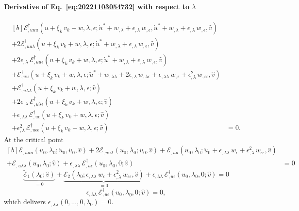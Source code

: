\documentclass[12pt, final]{scrartcl}
\theoremstyle{definition}
\newcommand{\E}{\mathcal E}
\newcommand{\EE}{\mathcal E ^ \dagger}
\begin{document}
\paragraph{Derivative of Eq.~\eqref{eq:20221103054732} with respect to \(\lambda\)}
\begin{equation}
  \label{eq:20221116070255}
  \begin{aligned}[b]
    \EE_{,uuu}(u + \xi_k \, v_k + w, \lambda, \epsilon; \dot{u}^\ast + w_{,\lambda} + \epsilon_{,\lambda} \, w_{,\epsilon}, \dot{u}^\ast + w_{,\lambda} + \epsilon_{,\lambda} \, w_{,\epsilon}, \hat{v}) &\\
    + 2\EE_{,uu\lambda}(u + \xi_k \, v_k + w, \lambda, \epsilon; \dot{u}^\ast + w_{,\lambda} + \epsilon_{,\lambda} \, w_{,\epsilon}, \hat{v}) &\\
    + 2\epsilon_{,\lambda} \, \EE_{,uu\epsilon}(u + \xi_k \, v_k + w, \lambda, \epsilon; \dot{u}^\ast + w_{,\lambda} + \epsilon_{,\lambda} \, w_{,\epsilon}, \hat{v}) &\\
    + \EE_{,uu}(u + \xi_k \, v_k + w, \lambda, \epsilon; \ddot{u}^\ast + w_{,\lambda\lambda} + 2\epsilon_{,\lambda} \, w_{,\lambda\epsilon} + \epsilon_{,\lambda\lambda} \, w_{,\epsilon} + \epsilon_{,\lambda}^2 \, w_{,\epsilon\epsilon}, \hat{v}) &\\
    + \EE_{,u\lambda\lambda}(u + \xi_k \, v_k + w, \lambda, \epsilon; \hat{v})&\\
    + 2\epsilon_{,\lambda} \, \EE_{,u\lambda\epsilon}(u + \xi_k \, v_k + w, \lambda, \epsilon; \hat{v}) &\\
    + \epsilon_{,\lambda\lambda} \, \EE_{,u\epsilon}(u + \xi_k \, v_k + w, \lambda, \epsilon; \hat{v}) &\\
    + \epsilon_{,\lambda}^2 \, \EE_{,u\epsilon\epsilon}(u + \xi_k \, v_k + w, \lambda, \epsilon; \hat{v}) &= 0.
  \end{aligned}
\end{equation}
At the critical point
\begin{equation*}
  \begin{aligned}[b]
    \E_{,uuu}(u_0, \lambda_0; \dot{u}_0, \dot{u}_0, \hat{v}) + 2\E_{,uu\lambda}(u_0, \lambda_0; \dot{u}_0, \hat{v}) + \E_{,uu}(u_0, \lambda_0; \ddot{u}_0 + \epsilon_{,\lambda\lambda} \, w_\epsilon + \epsilon_{,\lambda}^2 \, w_{\epsilon\epsilon}, \hat{v}) &\\
    + \E_{,u\lambda\lambda}(u_0, \lambda_0; \hat{v}) + \epsilon_{,\lambda\lambda} \, \EE_{,u\epsilon}(u_0, \lambda_0, 0; \hat{v}) &= 0
  \end{aligned}
\end{equation*}
\begin{equation*}
  \underbrace{\ddot{\E}_1(\lambda_0; \hat{v})}_{=0}
  + \underbrace{\E_2(\lambda_0; \epsilon_{,\lambda\lambda} \, w_\epsilon + \epsilon_{,\lambda}^2 \, w_{\epsilon\epsilon}, \hat{v})}_{=0}
  + \epsilon_{,\lambda\lambda} \, \EE_{,u\epsilon}(u_0, \lambda_0, 0; \hat{v}) = 0
\end{equation*}
\begin{equation}
  \epsilon_{,\lambda\lambda} \, \EE_{,u\epsilon}(u_0, \lambda_0, 0; \hat{v}) = 0,
\end{equation}
which delivers \(\epsilon_{,\lambda\lambda}(0, \ldots, 0, \lambda_0) = 0\).
\end{document}
